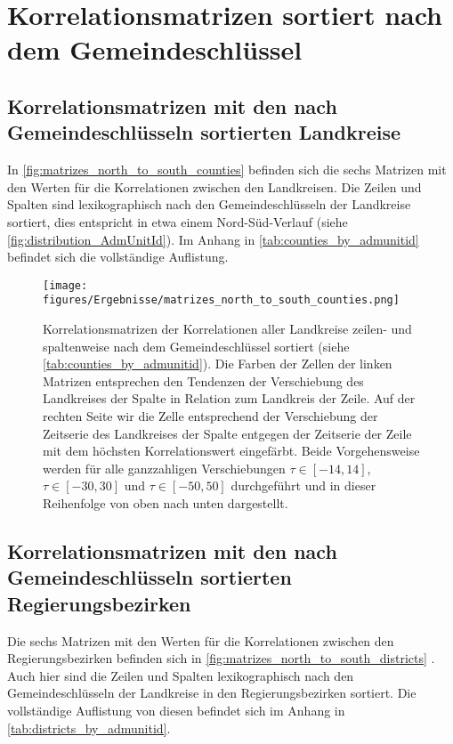 \section{Korrelationsmatrizen sortiert nach dem Gemeindeschlüssel}
\subsection{Korrelationsmatrizen mit den nach Gemeindeschlüsseln sortierten Landkreise}
In \autoref{fig:matrizes_north_to_south_counties} befinden sich die sechs Matrizen mit den Werten für die Korrelationen zwischen den Landkreisen.
Die Zeilen und Spalten sind lexikographisch nach den Gemeindeschlüsseln der Landkreise sortiert, dies entspricht in etwa einem Nord-Süd-Verlauf (siehe \autoref{fig:distribution_AdmUnitId}). Im Anhang in \autoref{tab:counties_by_admunitid} befindet sich die vollständige Auflistung.

\begin{figure}[H]
    \centering
    \texttt{[image: figures/Ergebnisse/matrizes\_north\_to\_south\_counties.png]}
    \caption{Korrelationsmatrizen der Korrelationen aller Landkreise zeilen- und spaltenweise nach dem Gemeindeschlüssel sortiert (siehe \autoref{tab:counties_by_admunitid}). Die Farben der Zellen der linken Matrizen entsprechen den Tendenzen der Verschiebung des Landkreises der Spalte in Relation zum Landkreis der Zeile.
    Auf der rechten Seite wir die Zelle entsprechend der Verschiebung der Zeitserie des Landkreises der Spalte entgegen der Zeitserie der Zeile mit dem höchsten Korrelationswert eingefärbt. Beide Vorgehensweise werden für alle ganzzahligen Verschiebungen $\tau\in[-14,14]$,  $\tau\in[-30,30]$ und  $\tau\in[-50,50]$ durchgeführt und in dieser Reihenfolge von oben nach unten dargestellt.}
    \label{fig:matrizes_north_to_south_counties}
\end{figure}
\subsection{Korrelationsmatrizen mit den nach Gemeindeschlüsseln sortierten Regierungsbezirken}
Die sechs Matrizen mit den Werten für die Korrelationen zwischen den Regierungsbezirken befinden sich in \autoref{fig:matrizes_north_to_south_districts} . Auch hier sind die Zeilen und Spalten lexikographisch nach den Gemeindeschlüsseln der Landkreise in den Regierungsbezirken sortiert. Die vollständige Auflistung von diesen befindet sich im Anhang in \autoref{tab:districts_by_admunitid}.

